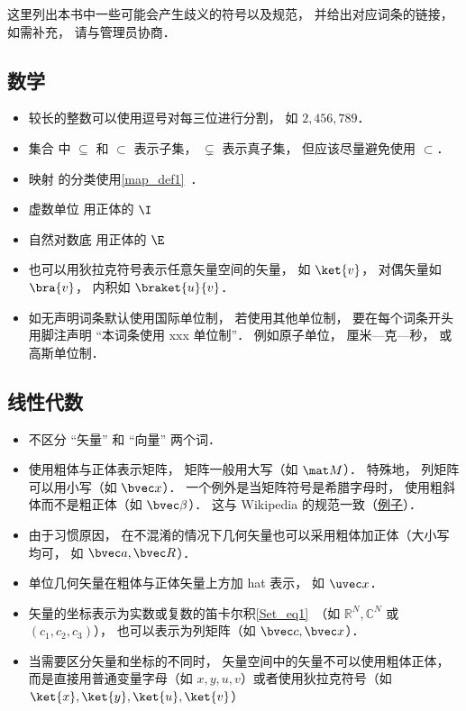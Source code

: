 
这里列出本书中一些可能会产生歧义的符号以及规范， 并给出对应词条的链接， 如需补充， 请与管理员协商．

\subsection{数学}
\begin{itemize}
\item 较长的整数可以使用逗号对每三位进行分割， 如 $2,456,789$．
\item 集合 中 $\subseteq$ 和 $\subset$ 表示子集， $\subsetneq$ 表示真子集， 但应该尽量避免使用 $\subset$．
\item 映射 的分类使用\autoref{map_def1}~．
\item 虚数单位 用正体的 $\I$
\item 自然对数底 用正体的 $\E$
\item 也可以用狄拉克符号表示任意矢量空间的矢量， 如 $\ket{v}$， 对偶矢量如 $\bra{v}$， 内积如 $\braket{u}{v}$．
\item 如无声明词条默认使用国际单位制， 若使用其他单位制， 要在每个词条开头用脚注声明 “本词条使用 xxx 单位制”． 例如原子单位， 厘米—克—秒， 或高斯单位制．
\end{itemize}

\subsection{线性代数}
\begin{itemize}
\item 不区分 “矢量” 和 “向量” 两个词．
\item 使用粗体与正体表示矩阵， 矩阵一般用大写（如 $\mat M$）． 特殊地， 列矩阵可以用小写（如 $\bvec x$）． 一个例外是当矩阵符号是希腊字母时， 使用粗斜体而不是粗正体（如 $\bvec \beta$）． 这与 Wikipedia 的规范一致（\href{https://en.wikipedia.org/wiki/Angular_acceleration}{例子}）．
\item 由于习惯原因， 在不混淆的情况下几何矢量也可以采用粗体加正体（大小写均可， 如 $\bvec a, \bvec R$）．
\item 单位几何矢量在粗体与正体矢量上方加 hat 表示， 如 $\uvec x$．
\item 矢量的坐标表示为实数或复数的笛卡尔积\autoref{Set_eq1}~（如 $\mathbb R^N, \mathbb C^N$ 或 $(c_1, c_2, c_3)$）， 也可以表示为列矩阵（如 $\bvec c, \bvec x$）．
\item 当需要区分矢量和坐标的不同时， 矢量空间中的矢量不可以使用粗体正体， 而是直接用普通变量字母（如 $x, y, u, v$）或者使用狄拉克符号（如 $\ket{x}, \ket{y}, \ket{u}, \ket{v}$）
\end{itemize}

